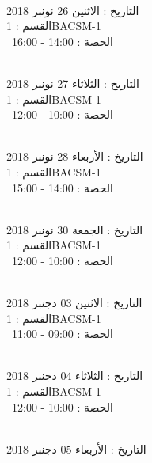 \par
\noindent\makebox[\linewidth]{\rule{\paperwidth}{0.4pt}}
 \\
التاريخ : الاثنين 26 نونبر 2018 \\
القسم : 1BACSM-1 \\
 \  
الحصة : 14:00 - 16:00 \\
\par
\noindent\makebox[\linewidth]{\rule{\paperwidth}{0.4pt}}
 \\
التاريخ : الثلاثاء 27 نونبر 2018 \\
القسم : 1BACSM-1 \\
 \  
الحصة : 10:00 - 12:00 \\
\par
\noindent\makebox[\linewidth]{\rule{\paperwidth}{0.4pt}}
 \\
التاريخ : الأربعاء 28 نونبر 2018 \\
القسم : 1BACSM-1 \\
 \  
الحصة : 14:00 - 15:00 \\
\par
\noindent\makebox[\linewidth]{\rule{\paperwidth}{0.4pt}}
 \\
التاريخ : الجمعة 30 نونبر 2018 \\
القسم : 1BACSM-1 \\
 \  
الحصة : 10:00 - 12:00 \\
\par
\noindent\makebox[\linewidth]{\rule{\paperwidth}{0.4pt}}
 \\
التاريخ : الاثنين 03 دجنبر 2018 \\
القسم : 1BACSM-1 \\
 \  
الحصة : 09:00 - 11:00 \\
\par
\noindent\makebox[\linewidth]{\rule{\paperwidth}{0.4pt}}
 \\
التاريخ : الثلاثاء 04 دجنبر 2018 \\
القسم : 1BACSM-1 \\
 \  
الحصة : 10:00 - 12:00 \\
\par
\noindent\makebox[\linewidth]{\rule{\paperwidth}{0.4pt}}
 \\
التاريخ : الأربعاء 05 دجنبر 2018 \\
